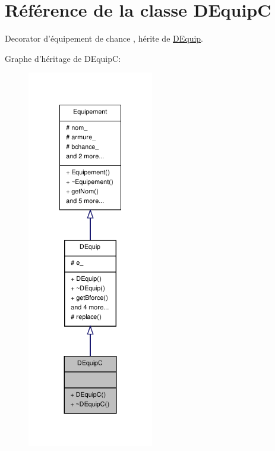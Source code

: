 \hypertarget{class_d_equip_c}{\section{Référence de la classe D\-Equip\-C}
\label{class_d_equip_c}
}


Decorator d'équipement de chance , hérite de \hyperlink{class_d_equip}{D\-Equip}.  




Graphe d'héritage de D\-Equip\-C\-:
\nopagebreak
\begin{figure}[H]
\begin{center}
\leavevmode
\includegraphics[width=156pt]{class_d_equip_c__inherit__graph}
\end{center}
\end{figure}


